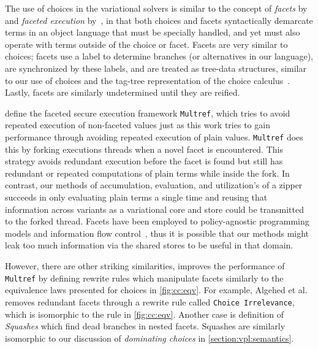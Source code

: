 The use of choices in the variational solvers is similar to the concept of
\textit{facets} by~\cite{austin2012multiple} and \textit{faceted execution}
by~\cite{Schmitz2018FacetedSM,Micinski2018AbstractingFE,10.1145/2465106.2465121},
in that both choices and facets syntactically demarcate terms in an object
language that must be specially handled, and yet must also operate with terms
outside of the choice or facet. Facets are very similar to choices; facets use a
label to determine branches (or alternatives in our language), are synchronized
by these labels, and are treated as tree-data structures, similar to our use of
choices and the tag-tree representation of the choice
calculus~\cite{Walk13thesis}. Lastly, facets are similarly undetermined until
they are reified.

\citet{10.1145/3243734.3243806} define the faceted secure execution framework
\texttt{Multref}, which tries to avoid repeated execution of non-faceted values
just as this work tries to gain performance through avoiding repeated execution
of plain values. \texttt{Multref} does this by forking executions threads when a
novel facet is encountered. This strategy avoids redundant execution before the
facet is found but still has redundant or repeated computations of plain terms
while inside the fork. In contrast, our methods of accumulation, evaluation, and
utilization's of a zipper succeeds in only evaluating plain terms a single time
and reusing that information across variants as a variational core and store
could be transmitted to the forked thread. Facets have been employed to
policy-agnostic programming models and information flow control~\cite{IFC}, thus
it is possible that our methods might leak too much information via the shared
stores to be useful in that domain.

However, there are other striking similarities, \citet{optimisingFacets}
improves the performance of \texttt{Multref} by defining rewrite rules which
manipulate facets similarly to the equivalence laws presented for choices in
\autoref{fig:cc:eqv}. For example, Algehed et al. removes redundant facets
through a rewrite rule called \texttt{Choice Irrelevance}, which is isomorphic
to the  rule in \autoref{fig:cc:eqv}. Another case is definition of
\emph{Squashes} which find dead branches in nested facets. Squashes are
similarly isomorphic to our discussion of \emph{dominating choices} in
\autoref{section:vpl:semantics}.



